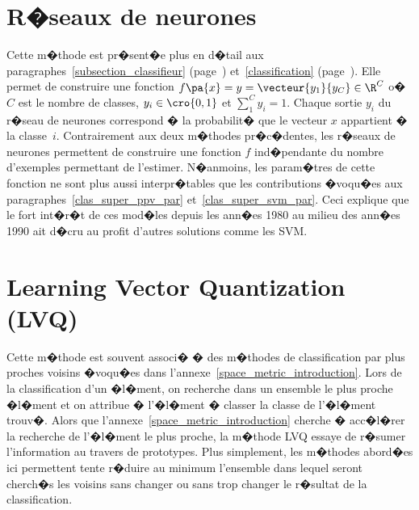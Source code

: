 \section{R�seaux de neurones}
\label{clas_super_nn_par}

Cette m�thode est pr�sent�e plus en d�tail aux paragraphes~\ref{subsection_classifieur} (page~\pageref{subsection_classifieur}) et~\ref{classification} (page~\pageref{classification}). Elle permet de construire une fonction $f\pa{x} = y = \vecteur{y_1}{y_C} \in \R^C$ o� $C$ est le nombre de classes, $y_i \in \cro{0,1}$ et $\sum^C_1 y_i = 1$. Chaque sortie $y_i$ du r�seau de neurones correspond � la probabilit� que le vecteur $x$ appartient � la classe~$i$. Contrairement aux deux m�thodes pr�c�dentes, les r�seaux de neurones permettent de construire une fonction $f$ ind�pendante du nombre d'exemples permettant de l'estimer. N�anmoins, les param�tres de cette fonction ne sont plus aussi interpr�tables que les contributions �voqu�es aux paragraphes~\ref{clas_super_ppv_par} et~\ref{clas_super_svm_par}. Ceci explique que le fort int�r�t de ces mod�les depuis les ann�es 1980 au milieu des ann�es 1990 ait d�cru au profit d'autres solutions comme les SVM.







\section{Learning Vector Quantization (LVQ)}

Cette m�thode est souvent associ� � des m�thodes de classification par plus proches voisins �voqu�es dans l'annexe~\ref{space_metric_introduction}. Lors de la classification d'un �l�ment, on recherche dans un ensemble le plus proche �l�ment et on attribue � l'�l�ment � classer la classe de l'�l�ment trouv�. Alors que l'annexe~\ref{space_metric_introduction} cherche � acc�l�rer la recherche de l'�l�ment le plus proche, la m�thode LVQ essaye de r�sumer l'information au travers de prototypes. Plus simplement, les m�thodes abord�es ici permettent tente r�duire au minimum l'ensemble dans lequel seront cherch�s les voisins sans changer ou sans trop changer le r�sultat de la classification. 

